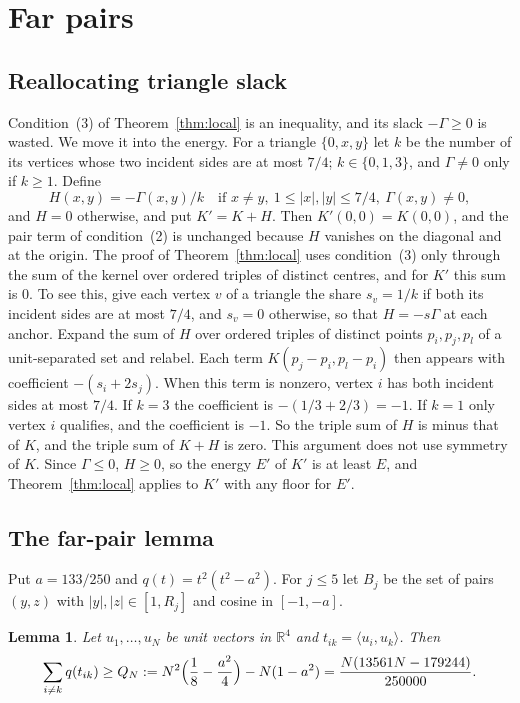 \documentclass[11pt]{amsart}
\numberwithin{equation}{section}
\newtheorem{lemma}[theorem]{Lemma}
\theoremstyle{remark}
\newcommand{\R}{\mathbb{R}}
\newcommand{\ip}[2]{\langle #1,#2\rangle}
\newcommand{\Gam}{\Gamma}
\begin{document}
\section{Far pairs}\label{sec:far}

\subsection*{Reallocating triangle slack}
Condition~(3) of Theorem~\ref{thm:local} is an inequality, and its slack $-\Gam\ge0$ is wasted. We move it into the energy. For a triangle $\{0,x,y\}$ let $k$ be the number of its vertices whose two incident sides are at most $7/4$; $k\in\{0,1,3\}$, and $\Gam\ne0$ only if $k\ge1$. Define
\[
H(x,y)=-\Gam(x,y)/k\quad\text{if }x\ne y,\ 1\le|x|,|y|\le7/4,\ \Gam(x,y)\ne0,
\]
and $H=0$ otherwise, and put $K'=K+H$. Then $K'(0,0)=K(0,0)$, and the pair term of condition~(2) is unchanged because $H$ vanishes on the diagonal and at the origin. The proof of Theorem~\ref{thm:local} uses condition~(3) only through the sum of the kernel over ordered triples of distinct centres, and for $K'$ this sum is $0$. To see this, give each vertex $v$ of a triangle the share $s_v=1/k$ if both its incident sides are at most $7/4$, and $s_v=0$ otherwise, so that $H=-s\Gam$ at each anchor. Expand the sum of $H$ over ordered triples of distinct points $p_i,p_j,p_l$ of a unit-separated set and relabel. Each term $K(p_j-p_i,p_l-p_i)$ then appears with coefficient $-(s_i+2s_j)$. When this term is nonzero, vertex $i$ has both incident sides at most $7/4$. If $k=3$ the coefficient is $-(1/3+2/3)=-1$. If $k=1$ only vertex $i$ qualifies, and the coefficient is $-1$. So the triple sum of $H$ is minus that of $K$, and the triple sum of $K+H$ is zero. This argument does not use symmetry of $K$. Since $\Gam\le0$, $H\ge0$, so the energy $E'$ of $K'$ is at least $E$, and Theorem~\ref{thm:local} applies to $K'$ with any floor for $E'$.

\subsection*{The far-pair lemma}
Put $a=133/250$ and $q(t)=t^2(t^2-a^2)$. For $j\le5$ let $B_j$ be the set of pairs $(y,z)$ with $|y|,|z|\in[1,R_j]$ and cosine in $[-1,-a]$.

\begin{lemma}\label{lem:quartic}
Let $u_1,\dots,u_N$ be unit vectors in $\R^4$ and $t_{ik}=\ip{u_i}{u_k}$. Then
\[
\sum_{i\ne k}q(t_{ik})\ge Q_N:=N^2\Bigl(\frac18-\frac{a^2}4\Bigr)-N(1-a^2)=\frac{N(13561N-179244)}{250000}.
\]
\end{lemma}
\end{document}
